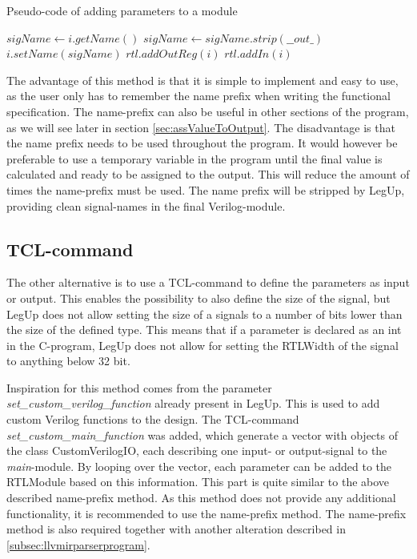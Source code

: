 \begin{algorithm}
  \caption{\label{alg:addInOut}Pseudo-code of adding parameters to a module}
  \begin{algorithmic}[1]
    \Statex
    \State $sigName \gets i.getName()$
      \State $sigName \gets sigName.strip(\_\_out\_)$
      \State $i.setName(sigName)$
      \State $rtl.addOutReg(i)$
    \Else
      \State $rtl.addIn(i)$
    \EndIf
  \end{algorithmic}
\end{algorithm}

The advantage of this method is that it is simple to implement and easy to use, as the user only has to remember the name prefix when writing the functional specification. The name-prefix can also be useful in other sections of the program, as we will see later in section \ref{sec:assValueToOutput}. The disadvantage is that the name prefix needs to be used throughout the program. It would however be preferable to use a temporary variable in the program until the final value is calculated and ready to be assigned to the output. This will reduce the amount of times the name-prefix must be used. The name prefix will be stripped by LegUp, providing clean signal-names in the final Verilog-module.
\subsection{\label{subsubsec:inoutparameter}TCL-command}
The other alternative is to use a TCL-command to define the parameters as input or output. This enables the possibility to also define the size of the signal, but LegUp does not allow setting the size of a signals to a number of bits lower than the size of the defined type. This means that if a parameter is declared as an int in the C-program, LegUp does not allow for setting the RTLWidth of the signal to anything below 32 bit.

Inspiration for this method comes from the parameter \textit{set\_custom\_verilog\_function} already present in LegUp. This is used to add custom Verilog functions to the design. The TCL-command \textit{set\_custom\_main\_function} was added, which generate a vector with objects of the class CustomVerilogIO, each describing one input- or output-signal to the \textit{main}-module. By looping over the vector, each parameter can be added to the RTLModule based on this information. This part is quite similar to the above described name-prefix method. As this method does not provide any additional functionality, it is recommended to use the name-prefix method. The name-prefix method is also required together with another alteration described in \cref{subsec:llvmirparserprogram}.

